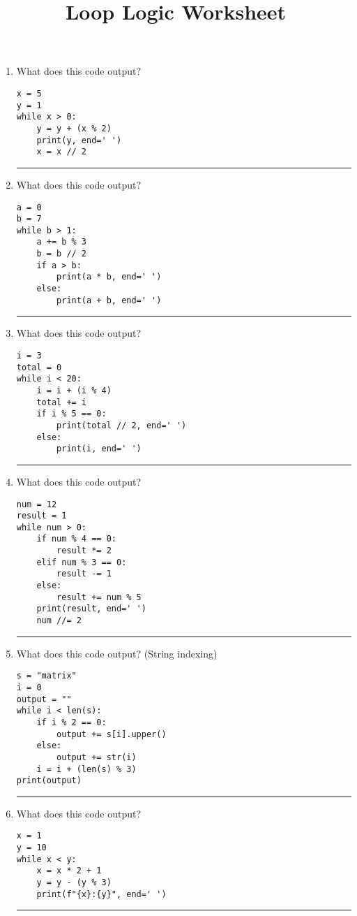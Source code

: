 \documentclass{article}
\title{\vspace{-3em}Loop Logic Worksheet\vspace{-2em}}
\begin{document}
\maketitle

\begin{enumerate}
    \item What does this code output?
    \begin{lstlisting}
x = 5
y = 1
while x > 0:
    y = y + (x % 2)
    print(y, end=' ')
    x = x // 2
    \end{lstlisting}
    \rule{\linewidth}{0.4pt}
    
    \item What does this code output?
    \begin{lstlisting}
a = 0
b = 7
while b > 1:
    a += b % 3
    b = b // 2
    if a > b:
        print(a * b, end=' ')
    else:
        print(a + b, end=' ')
    \end{lstlisting}
    \rule{\linewidth}{0.4pt}
    
    \item What does this code output?
    \begin{lstlisting}
i = 3
total = 0
while i < 20:
    i = i + (i % 4)
    total += i
    if i % 5 == 0:
        print(total // 2, end=' ')
    else:
        print(i, end=' ')
    \end{lstlisting}
    \rule{\linewidth}{0.4pt}
    
    \item What does this code output?
    \begin{lstlisting}
num = 12
result = 1
while num > 0:
    if num % 4 == 0:
        result *= 2
    elif num % 3 == 0:
        result -= 1
    else:
        result += num % 5
    print(result, end=' ')
    num //= 2
    \end{lstlisting}
    \rule{\linewidth}{0.4pt}
    
    \item What does this code output? (String indexing)
    \begin{lstlisting}
s = "matrix"
i = 0
output = ""
while i < len(s):
    if i % 2 == 0:
        output += s[i].upper()
    else:
        output += str(i)
    i = i + (len(s) % 3)
print(output)
    \end{lstlisting}
    \rule{\linewidth}{0.4pt}
    
    \item What does this code output?
    \begin{lstlisting}
x = 1
y = 10
while x < y:
    x = x * 2 + 1
    y = y - (y % 3)
    print(f"{x}:{y}", end=' ')
    \end{lstlisting}
    \rule{\linewidth}{0.4pt}
    

\end{enumerate}
\end{document}
